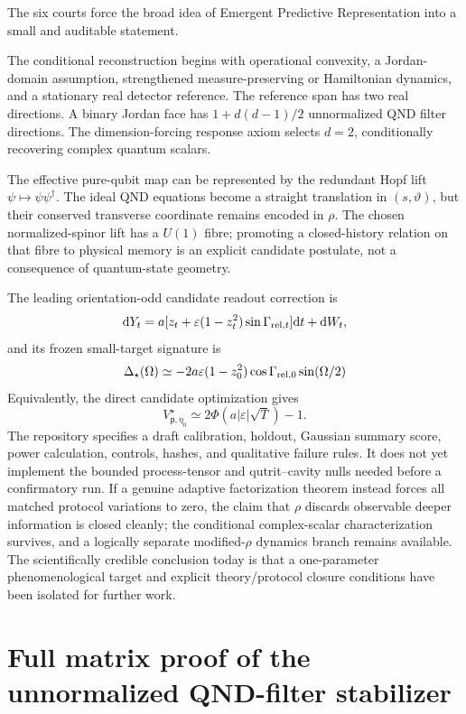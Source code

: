 \documentclass[10pt]{article}
\theoremstyle{definition}
\theoremstyle{remark}
\newcommand{\dd}{\mathrm d}
\begin{document}
The six courts force the broad idea of Emergent Predictive Representation into a small and auditable statement.

The conditional reconstruction begins with operational convexity, a Jordan-domain assumption, strengthened measure-preserving or Hamiltonian dynamics, and a stationary real detector reference. The reference span has two real directions. A binary Jordan face has \(1+d(d-1)/2\) unnormalized QND filter directions. The dimension-forcing response axiom selects \(d=2\), conditionally recovering complex quantum scalars.

The effective pure-qubit map can be represented by the redundant Hopf lift \(\psi\mapsto\psi\psi^\dagger\). The ideal QND equations become a straight translation in \((s,\vartheta)\), but their conserved transverse coordinate remains encoded in \(\rho\). The chosen normalized-spinor lift has a \(U(1)\) fibre; promoting a closed-history relation on that fibre to physical memory is an explicit candidate postulate, not a consequence of quantum-state geometry.

The leading orientation-odd candidate readout correction is
\[
\dd Y_t
=a[z_t+\varepsilon(1-z_t^2)\sin\Gamma_{{\rm rel},t}]\dd t+\dd W_t,
\]
and its frozen small-target signature is
\[
\Delta_\star(\Omega)
\simeq-2a\varepsilon(1-z_0^2)
\cos\Gamma_{{\rm rel},0}\sin(\Omega/2)
\]
Equivalently, the direct candidate optimization gives
\[
V^\star_{\mathsf p,\eta_0}
\simeq2\Phi(a|\varepsilon|\sqrt T)-1.
\]
The repository specifies a draft calibration, holdout, Gaussian summary score, power calculation, controls, hashes, and qualitative failure rules. It does not yet implement the bounded process-tensor and qutrit--cavity nulls needed before a confirmatory run. If a genuine adaptive factorization theorem instead forces all matched protocol variations to zero, the claim that \(\rho\) discards observable deeper information is closed cleanly; the conditional complex-scalar characterization survives, and a logically separate modified-\(\rho\) dynamics branch remains available. The scientifically credible conclusion today is that a one-parameter phenomenological target and explicit theory/protocol closure conditions have been isolated for further work.

\appendix

\section{Full matrix proof of the unnormalized QND-filter stabilizer}
\label{app:stabilizer}
\end{document}

